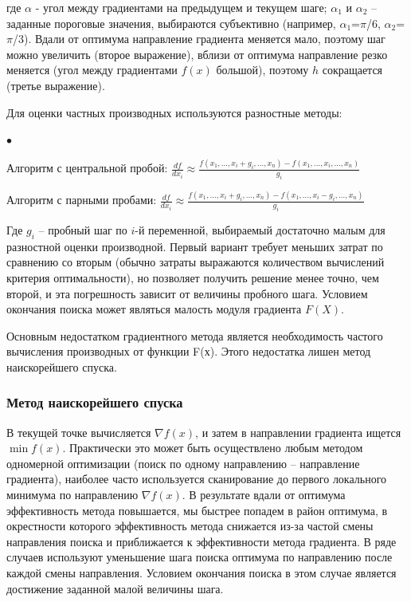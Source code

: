 \documentclass[12pt, a4paper]{article}
\newenvironment{compactlist}{
    \begin{list}{{$\bullet$}}{
      \setlength\partopsep{0pt}
      \setlength\parskip{0pt}
      \setlength\parsep{0pt}
      \setlength\topsep{0pt}
      \setlength\itemsep{0pt}
} }{
\end{list} }
\begin{document}
	где $\alpha$ -  угол между градиентами на предыдущем и текущем шаге; $\alpha_1$ и $\alpha_2$ – заданные пороговые значения, выбираются субъективно (например, $\alpha_1$=$\pi$/6, $\alpha_2$=$\pi$/3).
		Вдали от оптимума направление градиента меняется мало, поэтому шаг можно увеличить (второе выражение), вблизи от оптимума направление резко меняется (угол между градиентами $f(x)$ большой), поэтому $h$ сокращается (третье выражение).
	
	Для оценки частных производных используются разностные методы:
	\begin{compactlist}
		\item Алгоритм с центральной пробой: $\frac{df}{dx_i} \approx 
		\frac{f(x_1,...,x_i+g_i,...,x_n)-f(x_1,...,x_i,...,x_n)}{g_i}$	
		\item Алгоритм с парными пробами: $\frac{df}{dx_i} \approx 
		\frac{f(x_1,...,x_i+g_i,...,x_n)-f(x_1,...,x_i-g_i,...,x_n)}{g_i}$	
	\end{compactlist}
	Где $g_i$ – пробный шаг по $i$-й переменной, выбираемый достаточно малым для разностной оценки производной.
	Первый вариант требует меньших затрат по сравнению со вторым (обычно затраты выражаются количеством вычислений критерия оптимальности), но позволяет получить решение менее точно, чем второй, и эта погрешность зависит от величины проб­ного шага.
	Условием окончания поиска может являться малость модуля градиента $F(X)$.
	
	Основным недостатком градиентного метода является необходимость частого вычисления производных от функции F(х). Этого недостатка лишен метод наискорейшего спуска.
	
	\subsubsection*{Метод наискорейшего спуска}
	В текущей точке вычисляется  $\nabla f(x)$, и затем в направлении градиента ищется $\min f(x)$. Практически это может быть осуществлено любым методом одномерной оптимизации (поиск по одному направлению – направление градиента), наиболее часто используется сканирование до первого локального минимума по направлению $\nabla f(x)$. В результате вдали от оптимума эффективность метода повышается, мы быстрее попадем в район оптимума, в окрестности которого эффективность метода снижается из-за частой смены направления поиска и приближается к эффективности метода градиента. В ряде случаев используют уменьшение шага поиска оптимума по направлению после каждой смены направления. Условием окончания поиска в этом случае является достижение заданной малой величины шага.
	
\end{document}

